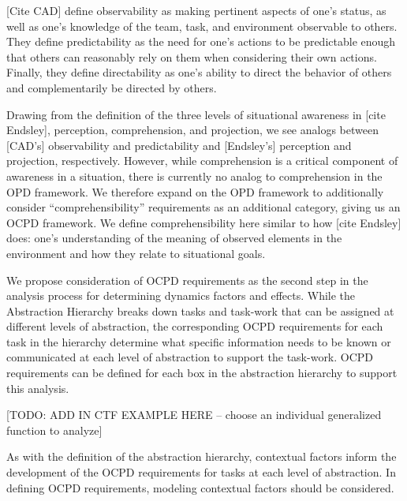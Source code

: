 \documentclass[letterpaper, 10 pt, conference]{ieeeconf}  %
\theoremstyle{definition}
\begin{document}
[Cite CAD] define observability as making pertinent aspects of one’s status, as well as one’s knowledge of the team, task, and environment observable to others. They define predictability as the need for one’s actions to be predictable enough that others can reasonably rely on them when considering their own actions. Finally, they define directability as one’s ability to direct the behavior of others and complementarily be directed by others. 

Drawing from the definition of the three levels of situational awareness in [cite Endsley], perception, comprehension, and projection, we see analogs between [CAD's] observability and predictability and [Endsley's] perception and projection, respectively. However, while comprehension is a critical component of awareness in a situation, there is currently no analog to comprehension in the OPD framework. We therefore expand on the OPD framework to additionally consider ``comprehensibility'' requirements as an additional category, giving us an OCPD framework. We define comprehensibility here similar to how [cite Endsley] does: one's understanding of the meaning of observed elements in the environment and how they relate to situational goals. 

We propose consideration of OCPD requirements as the second step in the analysis process for determining dynamics factors and effects. While the Abstraction Hierarchy breaks down tasks and task-work that can be assigned at different levels of abstraction, the corresponding OCPD requirements for each task in the hierarchy determine what specific information needs to be known or communicated at each level of abstraction to support the task-work. OCPD requirements can be defined for each box in the abstraction hierarchy to support this analysis. %

[TODO: ADD IN CTF EXAMPLE HERE -- choose an individual generalized function to analyze]

As with the definition of the abstraction hierarchy, contextual factors inform the development of the OCPD requirements for tasks at each level of abstraction. In defining OCPD requirements, modeling contextual factors should be considered. 
\end{document}
